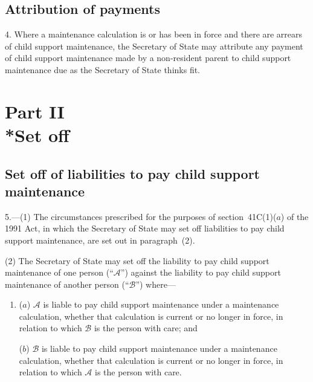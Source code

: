 \documentclass[12pt,a4paper]{article}
\begin{document}

\subsection[4. Attribution of payments]{Attribution of payments}

4.  Where a maintenance calculation is or has been in force and there are arrears of child support maintenance, the 
Secretary of State  %
may attribute any payment of child support maintenance made by a non-resident parent to child support maintenance due as 
the Secretary of State  %
thinks fit.


\section[Part II --- Set off]{Part II\\*Set off}

\renewcommand\parthead{--- Part II}

\subsection[5. Set off of liabilities to pay child support maintenance]{Set off of liabilities to pay child support maintenance}

5.---(1)  The circumstances prescribed for the purposes of section~41C(1)($a$)  of the 1991 Act, in which the 
Secretary of State  %
may set off liabilities to pay child support maintenance, are set out in paragraph~(2).

(2) The 
Secretary of State  %
may set off the liability to pay child support maintenance of one person (“$\mathcal{A}$”) against the liability to pay child support maintenance of another person (“$\mathcal{B}$”) where—
\begin{enumerate}\item[]
($a$) $\mathcal{A}$ is liable to pay child support maintenance under a maintenance calculation, whether that calculation is current or no longer in force, in relation to which $\mathcal{B}$ is the person with care; and

($b$) $\mathcal{B}$ is liable to pay child support maintenance under a maintenance calculation, whether that calculation is current or no longer in force, in relation to which $\mathcal{A}$ is the person with care.
\end{enumerate}
\end{document}
